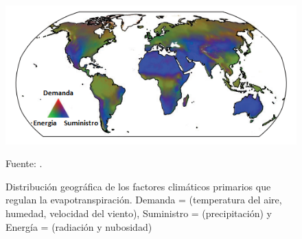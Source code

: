 \begin{figure}[ht!]
\centering
	\includegraphics[scale=1]{Images/zhang_rev01.png}
	\caption{Distribución geográfica de los factores climáticos primarios que regulan la evapotranspiración. Demanda = (temperatura del aire, humedad, velocidad del viento), Suministro = (precipitación) y Energía = (radiación y nubosidad)}
	Fuente: \citet{zhang2015vegetation}.
	\label{fig:zhang_rev01}
\end{figure}